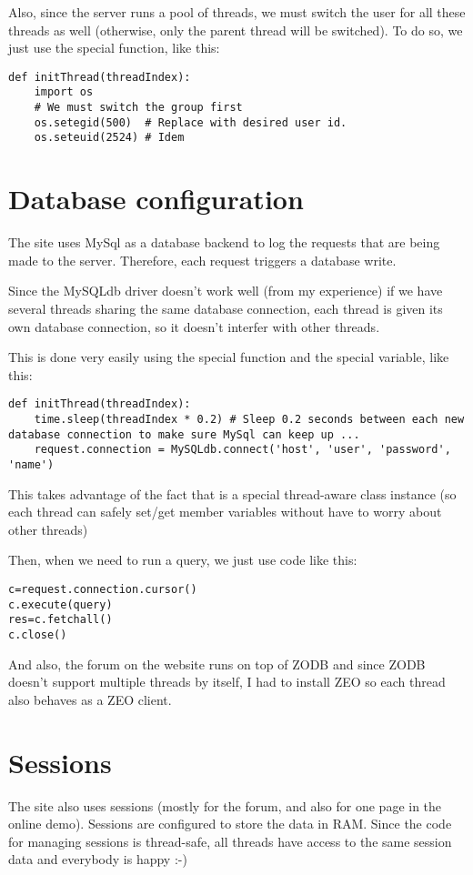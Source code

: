 \documentclass{manual}
\begin{document}
Also, since the server runs a pool of threads, we must switch the user for all these threads as well (otherwise,
only the parent thread will be switched). To do so, we just use the  special function, like this:

\begin{verbatim}
def initThread(threadIndex):
    import os
    # We must switch the group first
    os.setegid(500)  # Replace with desired user id.
    os.seteuid(2524) # Idem
\end{verbatim}


\section{Database configuration}
The site uses MySql as a database backend to log the requests that are being made to the server. Therefore, each request
triggers a database write.

Since the MySQLdb driver doesn't work well (from my experience) if we have several threads sharing the same database
connection, each thread is given its own database connection, so it doesn't interfer with other threads.

This is done very easily using the  special function and the  special variable, like this:

\begin{verbatim}
def initThread(threadIndex):
    time.sleep(threadIndex * 0.2) # Sleep 0.2 seconds between each new database connection to make sure MySql can keep up ...
    request.connection = MySQLdb.connect('host', 'user', 'password', 'name')
\end{verbatim}

This takes advantage of the fact that  is a special thread-aware class instance (so each thread can safely
set/get member variables without have to worry about other threads)

Then, when we need to run a query, we just use code like this:

\begin{verbatim}
c=request.connection.cursor()
c.execute(query)
res=c.fetchall()
c.close()
\end{verbatim}

And also, the forum on the website runs on top of ZODB and since ZODB doesn't support multiple threads by itself, I had to
install ZEO so each thread also behaves as a ZEO client.

\section{Sessions}
The site also uses sessions (mostly for the forum, and also for one page in the online demo).
Sessions are configured to store the data in RAM. Since the code for managing sessions is thread-safe,
all threads have access to the same session data and everybody is happy :-)
\end{document}
